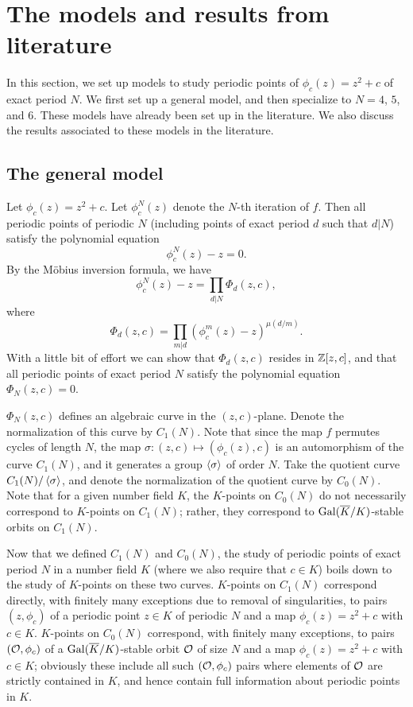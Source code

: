 \section{The models and results from literature}
\label{sec:model}

In this section, we set up models to study periodic points of
$\phi_c(z) = z^2 + c$ of exact period $N$. We first set up a general
model, and then specialize to $N = 4$, $5$, and $6$. These models have
already been set up in the literature. We also discuss the results
associated to these models in the literature.

\subsection{The general model}
\label{subsec:model-general}

Let $\phi_c(z) = z^2 + c$. Let $\phi_c^N(z)$ denote the $N$-th
iteration of $f$. Then all periodic points of periodic $N$ (including
points of exact period $d$ such that $d | N$) satisfy the polynomial
equation
\[
\phi_c^N(z) - z = 0.
\]
By the M\"obius inversion formula, we have
\[
\phi_c^N(z) - z = \prod_{d|N} \Phi_d(z, c),
\]
where
\[
\Phi_d(z, c) = \prod_{m|d}(\phi_c^m(z) - z)^{\mu(d/m)}.
\]
With a little bit of effort we can show that $\Phi_d(z, c)$ resides in
$\mathbb{Z}[z, c]$, and that all periodic points of exact period $N$ satisfy
the polynomial equation $\Phi_N(z, c) = 0$.

$\Phi_N(z, c)$ defines an algebraic curve in the $(z,
c)$-plane. Denote the normalization of this curve by $C_1(N)$. Note
that since the map $f$ permutes cycles of length $N$, the map $\sigma:
(z, c) \mapsto (\phi_c(z), c)$ is an automorphism of the curve
$C_1(N)$, and it generates a group $\left<\sigma\right>$ of order $N$. Take
the quotient curve $C_1(N)/\left<\sigma\right>$, and denote the normalization
of the quotient curve by $C_0(N)$. Note that for a given number field
$K$, the $K$-points on $C_0(N)$ do not necessarily correspond to
$K$-points on $C_1(N)$; rather, they correspond to
$\mathrm{Gal}(\overline{K}/K)$-stable orbits on $C_1(N)$.

Now that we defined $C_1(N)$ and $C_0(N)$, the study of periodic points
of exact period $N$ in a number field $K$ (where we also require that
$c \in K$) boils down to the study of $K$-points on these two
curves. $K$-points on $C_1(N)$ correspond directly, with finitely many
exceptions due to removal of singularities, to pairs $(z, \phi_c)$ of
a periodic point $z \in K$ of periodic $N$ and a map $\phi_c(z) = z^2
+ c$ with $c \in K$. $K$-points on $C_0(N)$ correspond, with finitely
many exceptions, to pairs $(\mathcal{O}, \phi_c)$ of a $\mathrm{Gal}(\overline{K}/K)$-stable
orbit $\mathcal{O}$ of size $N$ and a map $\phi_c(z) = z^2 + c$ with $c \in K$;
obviously these include all such $(\mathcal{O}, \phi_c)$ pairs where elements
of $\mathcal{O}$ are strictly contained in $K$, and hence contain full
information about periodic points in $K$.

